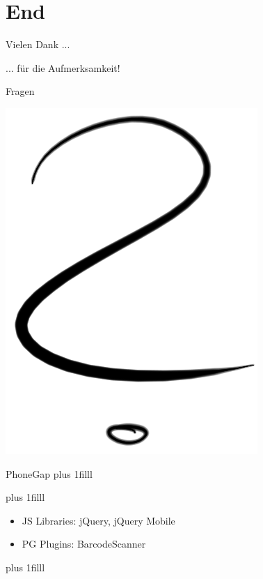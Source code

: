\documentclass{beamer}
\begin{document}
\part{End}


\begin{frame}{Vielen Dank ...}
\begin{center}
	... für die Aufmerksamkeit!
\end{center}
\end{frame}

\begin{frame}{Fragen}
\begin{center}
	\includegraphics[scale=0.2]{pics/qm.png}
\end{center}
\end{frame}

\begin{frame}{PhoneGap}
	\vskip0pt plus 1filll
	\begin{center}
	\end{center}
	\vskip0pt plus 1filll
	\begin{itemize}
		\item JS Libraries: jQuery, jQuery Mobile
		\item PG Plugins: BarcodeScanner
	\end{itemize}
	\vskip0pt plus 1filll
\end{frame}
\end{document}
